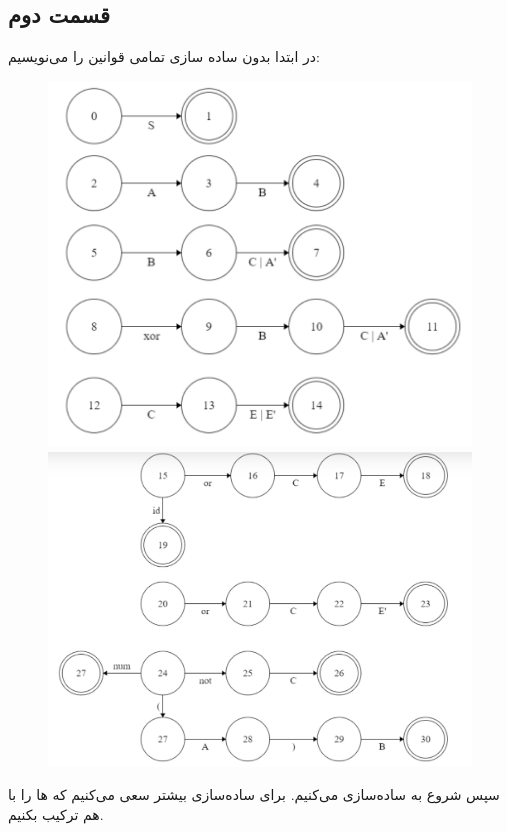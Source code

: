\documentclass[]{article}
\begin{document}
\subsection*{قسمت دوم}
در ابتدا بدون ساده سازی تمامی قوانین را می‌نویسیم:
\begin{figure}[H]
    \centering
    \includegraphics[scale=0.5]{figure/5-2-part1.png}
    \includegraphics[scale=0.5]{figure/5-2-part2.png}
\end{figure}
سپس شروع به ساده‌سازی می‌کنیم. برای ساده‌سازی بیشتر سعی می‌کنیم که
ها
را با هم ترکیب بکنیم.
\end{document}

